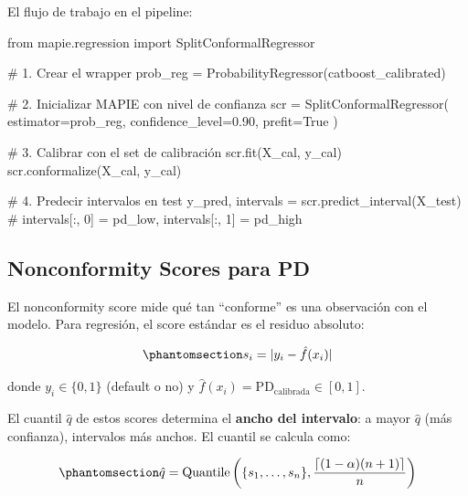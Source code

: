 \documentclass[
  spanish,
  11pt,
  letterpaper,
]{scrbook}
\newenvironment{Shaded}{\begin{snugshade}}{\end{snugshade}}
\newcommand{\CommentTok}[1]{\textcolor[rgb]{0.37,0.37,0.37}{#1}}
\newcommand{\FloatTok}[1]{\textcolor[rgb]{0.68,0.00,0.00}{#1}}
\newcommand{\ImportTok}[1]{\textcolor[rgb]{0.00,0.46,0.62}{#1}}
\newcommand{\NormalTok}[1]{\textcolor[rgb]{0.00,0.23,0.31}{#1}}
\newcommand{\OperatorTok}[1]{\textcolor[rgb]{0.37,0.37,0.37}{#1}}
\newcommand{\VariableTok}[1]{\textcolor[rgb]{0.07,0.07,0.07}{#1}}
\theoremstyle{plain}
\theoremstyle{remark}
\begin{document}
El flujo de trabajo en el pipeline:

\begin{Shaded}
\begin{Highlighting}[]
\ImportTok{from}\NormalTok{ mapie.regression }\ImportTok{import}\NormalTok{ SplitConformalRegressor}

\CommentTok{\# 1. Crear el wrapper}
\NormalTok{prob\_reg }\OperatorTok{=}\NormalTok{ ProbabilityRegressor(catboost\_calibrated)}

\CommentTok{\# 2. Inicializar MAPIE con nivel de confianza}
\NormalTok{scr }\OperatorTok{=}\NormalTok{ SplitConformalRegressor(}
\NormalTok{    estimator}\OperatorTok{=}\NormalTok{prob\_reg,}
\NormalTok{    confidence\_level}\OperatorTok{=}\FloatTok{0.90}\NormalTok{,}
\NormalTok{    prefit}\OperatorTok{=}\VariableTok{True}
\NormalTok{)}

\CommentTok{\# 3. Calibrar con el set de calibración}
\NormalTok{scr.fit(X\_cal, y\_cal)}
\NormalTok{scr.conformalize(X\_cal, y\_cal)}

\CommentTok{\# 4. Predecir intervalos en test}
\NormalTok{y\_pred, intervals }\OperatorTok{=}\NormalTok{ scr.predict\_interval(X\_test)}
\CommentTok{\# intervals[:, 0] = pd\_low, intervals[:, 1] = pd\_high}
\end{Highlighting}
\end{Shaded}

\subsection{Nonconformity Scores para
PD}\label{sec-nonconformity-scores}

El nonconformity score mide qué tan ``conforme'' es una observación con
el modelo. Para regresión, el score estándar es el residuo absoluto:

\begin{equation}\protect\phantomsection\label{eq-nonconformity}{
s_i = |y_i - \hat{f}(x_i)|
}\end{equation}

donde \(y_i \in \{0, 1\}\) (default o no) y
\(\hat{f}(x_i) = \text{PD}_\text{calibrada} \in [0, 1]\).

El cuantil \(\hat{q}\) de estos scores determina el \textbf{ancho del
intervalo}: a mayor \(\hat{q}\) (más confianza), intervalos más anchos.
El cuantil se calcula como:

\begin{equation}\protect\phantomsection\label{eq-conformal-quantile}{
\hat{q} = \text{Quantile}\left(\{s_1, \ldots, s_n\}, \frac{\lceil(1-\alpha)(n+1)\rceil}{n}\right)
}\end{equation}
\end{document}

